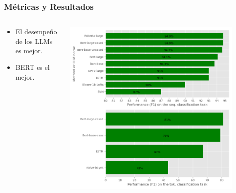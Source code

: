 \documentclass[10pt]{beamer}
\begin{document}
\begin{frame}
    \frametitle{Métricas y Resultados}
    \begin{columns}
        \begin{column}{0.3\textwidth}
            \begin{itemize}
                \item El desempeño de los LLMs es mejor.
                    \pause
                \item BERT es el mejor.
                    \pause
            \end{itemize}
        \end{column}
        \begin{column}{0.7\textwidth}
            \begin{center}
                \includegraphics[width=0.9\textwidth]{../Images/taskbars.png}
            \end{center}
        \end{column}
    \end{columns}
\end{frame}
\end{document}
